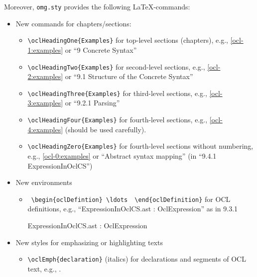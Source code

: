 \documentclass{omgrpt}
\begin{document}
Moreover,  \texttt{omg.sty} provides the following \LaTeX-commands:
\begin{itemize}
\item New commands for chapters/sections:
\begin{itemize}
\item \verb|\oclHeadingOne{Examples}| for top-level sections
    (chapters), e.g., \autoref{ocl-1:examples} or ``9 Concrete
    Syntax''%
\item \verb|\oclHeadingTwo{Examples}| for second-level sections,
    e.g., \autoref{ocl-2:examples}  or ``9.1 Structure of the Concrete
    Syntax''%
\item \verb|\oclHeadingThree{Examples}| for third-level sections,
    e.g., \autoref{ocl-3:examples} or ``9.2.1 Parsing''%
\item \verb|\oclHeadingFour{Examples}| for fourth-level sections,
    e.g., \autoref{ocl-4:examples} (should be used carefully).
\item \verb|\oclHeadingZero{Examples}| for fourth-level sections
    without numbering,
    e.g., \autoref{ocl-0:examples} or ``Abstract syntax mapping'' (in
    ``9.4.1 ExpressionInOclCS'')%
  \end{itemize}
\item New environments
  \begin{itemize}
  \item  \verb| \begin{oclDefintion} \ldots  \end{oclDefinition}| for
    OCL definitions, e.g., ``ExpressionInOclCS.ast : OclExpression''
    as in 9.3.1%
  \begin{oclDefinition}
    ExpressionInOclCS.ast : OclExpression
  \end{oclDefinition}
  \end{itemize}
\item New styles for emphasizing or highlighting texts
  \begin{itemize}
  \item  \verb|\oclEmph{declaration}| (italics) for declarations and segments of
OCL text, e.g., .
  \end{itemize}
\end{itemize}

\end{document}
